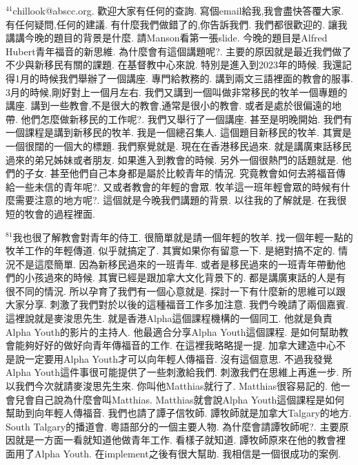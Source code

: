 \documentclass{book}
\begin{document}
$^{41}$chillook@abscc.org.
歡迎大家有任何的查詢.
寫個email給我,我會盡快答覆大家.
有任何疑問,任何的建議.
有什麼我們做錯了的,你告訴我們.
我們都很歡迎的.
讓我講講今晚的題目的背景是什麼.
請Manson看第一張slide.
今晚的題目是Alfred Hubert青年福音的新思維.
為什麼會有這個講題呢?.
主要的原因就是最近我們做了不少與新移民有關的課題.
在基督教中心來說.
特別是進入到2023年的時候.
我還記得1月的時候我們舉辦了一個講座.
專門給教務的.
講到兩文三語裡面的教會的服事.
3月的時候,剛好對上一個月左右.
我們又講到一個叫做非常移民的牧羊一個專題的講座.
講到一些教會,不是很大的教會,通常是很小的教會.
或者是處於很偏遠的地帶.
他們怎麼做新移民的工作呢?.
我們又舉行了一個講座.
甚至是明晚開始.
我們有一個課程是講到新移民的牧羊.
我是一個總召集人.
這個題目新移民的牧羊.
其實是一個很闊的一個大的標題.
我們察覺就是.
現在在香港移民過來.
就是講廣東話移民過來的弟兄姊妹或者朋友.
如果進入到教會的時候.
另外一個很熱門的話題就是.
他們的子女.
甚至他們自己本身都是屬於比較青年的情況.
究竟教會如何去將福音傳給一些未信的青年呢?.
又或者教會的年輕的會眾.
牧羊這一班年輕會眾的時候有什麼需要注意的地方呢?.
這個就是今晚我們講題的背景.
以往我的了解就是.
在我很短的牧會的過程裡面.

$^{81}$我也很了解教會對青年的侍工.
很簡單就是請一個年輕的牧羊.
找一個年輕一點的牧羊工作的年輕傳道.
似乎就搞定了.
其實如果你有留意一下.
是絕對搞不定的.
情況不是這麼簡單.
因為新移民過來的一班青年.
或者是移民過來的一班青年帶動他們的小孩過來的時候.
其實已經是跟加拿大文化背景下的.
都是講廣東話的人是有很不同的情況.
所以孕育了我們有一個心意就是.
探討一下有什麼新的思維可以跟大家分享.
刺激了我們對於以後的這種福音工作多加注意.
我們今晚請了兩個嘉賓.
這裡說就是麥浚思先生.
就是香港Alpha這個課程機構的一個同工.
他就是負責Alpha Youth的影片的主持人.
他最適合分享Alpha Youth這個課程.
是如何幫助教會能夠好好的做好向青年傳福音的工作.
在這裡我略略提一提.
加拿大建造中心不是說一定要用Alpha Youth才可以向年輕人傳福音.
沒有這個意思.
不過我發覺Alpha Youth這件事很可能提供了一些刺激給我們.
刺激我們在思維上再進一步.
所以我們今次就請麥浚思先生來.
你叫他Matthias就行了.
Matthias很容易記的.
他一會兒會自己說為什麼會叫Matthias.
Matthias就會說Alpha Youth這個課程是如何幫助到向年輕人傳福音.
我們也請了譚子信牧師.
譚牧師就是加拿大Talgary的地方.
South Talgary的播道會.
粵語部分的一個主要人物.
為什麼會請譚牧師呢?.
主要原因就是一方面一看就知道他做青年工作.
看樣子就知道.
譚牧師原來在他的教會裡面用了Alpha Youth.
在implement之後有很大幫助.
我相信是一個很成功的案例.
\end{document}
